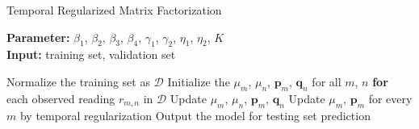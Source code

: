 \begin{algorithm}
	\caption{Temporal Regularized Matrix Factorization}
	\label{alg:TRMF}
	\textbf{Parameter:} $\beta_1$, $\beta_2$, $\beta_3$, $\beta_4$, $\gamma_1$, $\gamma_2$, $\eta_1$, $\eta_2$, $K$\\
	\textbf{Input:} training set, validation set
	\begin{algorithmic}
		\State Normalize the training set as $\mathcal{D}$
		\State Initialize the $\mu_m$, $\mu_n$, $\mathbf{p}_m$, $\mathbf{q}_n$ for all $m$, $n$
		\Repeat
			\State \textbf{for} each observed reading $r_{m,n}$ in $\mathcal{D}$
				\State \indent Update $\mu_m$, $\mu_n$, $\mathbf{p}_{m}$, $\mathbf{q}_{n}$
			\State Update $\mu_m$, $\mathbf{p}_m$ for every $m$ by temporal regularization
		\State Output the model for testing set prediction
	\end{algorithmic}
\end{algorithm}


